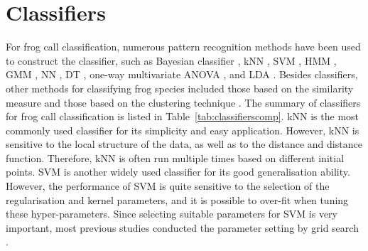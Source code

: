 \section{Classifiers}
\label{classifiers}
For frog call classification, numerous pattern recognition methods have been used to construct the classifier, such as Bayesian classifier \citep{Brandes2006}, kNN \citep{ huang2008realization,huang2009frog, han2011acoustic, dayou2011classification, jaafar2013mfcc, Gingras2013, jaafar2013mfcc,jaafarcomparative, yuan2013frog, vaca2010using, feature2012Colona}, SVM \citep{huang2008realization,acevedo2009automated, huang2009frog, tanintelligent2014, Gingras2013,jaafarcomparative}, HMM \citep{brandes2008feature}, GMM \citep{huang2008realization, Gingras2013}, NN \citep{Huang20141, yen2002automatic}, DT \citep{grigg1996monitoring, acevedo2009automated}, one-way multivariate ANOVA \citep{camacho2013automatic}, and LDA \citep{acevedo2009automated,lee2006automatic}. Besides classifiers, other methods for classifying frog species included those based on the similarity measure \citep{croker2012using, dang2008lightweight, chen2012automatic} and those based on the clustering technique \citep{colombia2009frogs, wei2012distributed, bedoya2014automatic}. The summary of classifiers for frog call classification is listed in Table~\ref{tab:classifierscomp}.
kNN is the most commonly used classifier for its simplicity and easy application. However, kNN is sensitive to the local structure of the data, as well as to the distance and distance function. Therefore, kNN is often run multiple times based on different initial points. 
SVM is another widely used classifier for its good generalisation ability. However, the performance of SVM is quite sensitive to the selection of the regularisation and kernel parameters, and it is possible to over-fit when tuning these hyper-parameters. Since selecting suitable parameters for SVM is very important, most previous studies conducted the parameter setting by grid search  \citep{hsu2003practical}.

